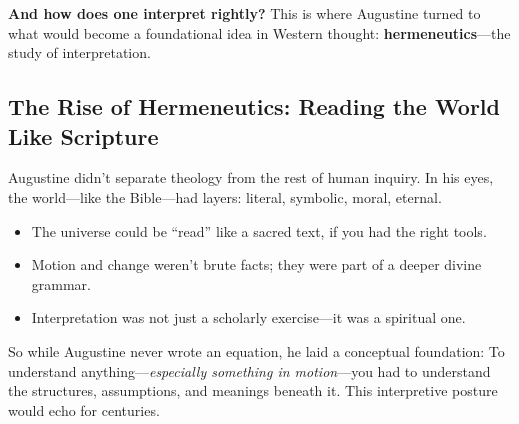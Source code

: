 \textbf{And how does one interpret rightly?} This is where Augustine turned to what would become a foundational idea in Western thought: \textbf{hermeneutics}—the study of interpretation.

\subsection{The Rise of Hermeneutics: Reading the World Like Scripture}

Augustine didn’t separate theology from the rest of human inquiry. In his eyes, the world—like the Bible—had layers: literal, symbolic, moral, eternal.

\begin{itemize}
  \item The universe could be “read” like a sacred text, if you had the right tools.
  \item Motion and change weren’t brute facts; they were part of a deeper divine grammar.
  \item Interpretation was not just a scholarly exercise—it was a spiritual one.
\end{itemize}

So while Augustine never wrote an equation, he laid a conceptual foundation:  
To understand anything—\textit{especially something in motion}—you had to understand the structures, assumptions, and meanings beneath it.  
This interpretive posture would echo for centuries.

